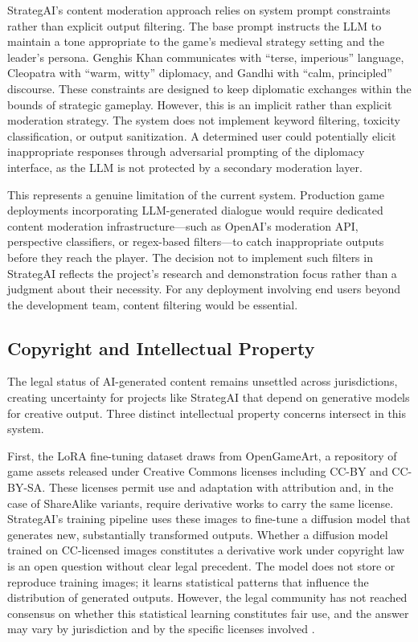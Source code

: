 \documentclass[conference]{IEEEtran}
\begin{document}
StrategAI's content moderation approach relies on system prompt constraints rather than explicit output filtering. The base prompt instructs the LLM to maintain a tone appropriate to the game's medieval strategy setting and the leader's persona. Genghis Khan communicates with ``terse, imperious'' language, Cleopatra with ``warm, witty'' diplomacy, and Gandhi with ``calm, principled'' discourse. These constraints are designed to keep diplomatic exchanges within the bounds of strategic gameplay. However, this is an implicit rather than explicit moderation strategy. The system does not implement keyword filtering, toxicity classification, or output sanitization. A determined user could potentially elicit inappropriate responses through adversarial prompting of the diplomacy interface, as the LLM is not protected by a secondary moderation layer.

This represents a genuine limitation of the current system. Production game deployments incorporating LLM-generated dialogue would require dedicated content moderation infrastructure---such as OpenAI's moderation API, perspective classifiers, or regex-based filters---to catch inappropriate outputs before they reach the player. The decision not to implement such filters in StrategAI reflects the project's research and demonstration focus rather than a judgment about their necessity. For any deployment involving end users beyond the development team, content filtering would be essential.

\subsection{Copyright and Intellectual Property}

The legal status of AI-generated content remains unsettled across jurisdictions, creating uncertainty for projects like StrategAI that depend on generative models for creative output. Three distinct intellectual property concerns intersect in this system.

First, the LoRA fine-tuning dataset draws from OpenGameArt, a repository of game assets released under Creative Commons licenses including CC-BY and CC-BY-SA. These licenses permit use and adaptation with attribution and, in the case of ShareAlike variants, require derivative works to carry the same license. StrategAI's training pipeline uses these images to fine-tune a diffusion model that generates new, substantially transformed outputs. Whether a diffusion model trained on CC-licensed images constitutes a derivative work under copyright law is an open question without clear legal precedent. The model does not store or reproduce training images; it learns statistical patterns that influence the distribution of generated outputs. However, the legal community has not reached consensus on whether this statistical learning constitutes fair use, and the answer may vary by jurisdiction and by the specific licenses involved \cite{samuelson2023generative}.
\end{document}

